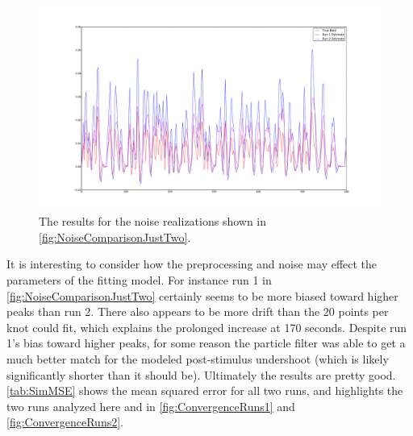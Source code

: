 \begin{figure}[H]
\label{fig:FitComparisonHighNoiseJust2}
\includegraphics[trim=6cm 3cm 6cm 3cm,width=16cm]{images/comparison_highnoise_just2}
\caption{The results for the noise realizations shown in \autoref{fig:NoiseComparisonJustTwo}.}
\end{figure}

It is interesting to consider how the preprocessing and noise may effect the
parameters of the fitting model. For instance run 1 in \autoref{fig:NoiseComparisonJustTwo}
certainly seems to be more biased toward higher peaks than run 2. There also appears
to be more drift than the 20 points per knot could fit, which explains the 
prolonged increase at 170 seconds. Despite run 1's bias toward higher peaks, for
some reason the particle filter was able to get a much better match for the
modeled post-stimulus undershoot (which is likely significantly shorter than it
should be). Ultimately the results are pretty good. \autoref{tab:SimMSE} shows
the mean squared error for all two runs, and highlights the two runs analyzed here and 
in \autoref{fig:ConvergenceRuns1} and \autoref{fig:ConvergenceRuns2}.

